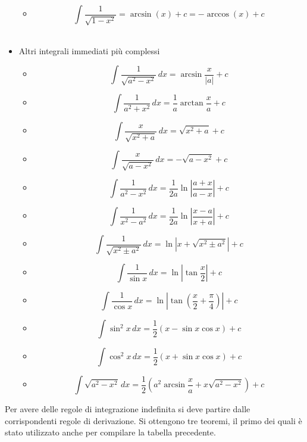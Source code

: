 \documentclass{article}
\theoremstyle{plain}
\theoremstyle{definition}
\theoremstyle{remark}
\begin{document}
\begin{multicols}{2}
\begin{itemize}
\begin{itemize}
            \item[] \[\int \dfrac{1}{\sqrt{1-x^2}}=\arcsin(x)+c=-\arccos(x)+c\]\\
        \end{itemize}
        \item Altri integrali immediati più complessi
        \begin{itemize}
            \item[] \[\int \dfrac{1}{\sqrt{a^2-x^2}} \,dx = \arcsin\dfrac{x}{|a|} +c\]
            \item[] \[\int \dfrac{1}{a^2+x^2} \,dx = \dfrac{1}{a}\arctan\dfrac{x}{a} +c\]
            \item[] \[\int \dfrac{x}{\sqrt{x^2+a}} \,dx = \sqrt{x^2+a} +c\]
            \item[] \[\int \dfrac{x}{\sqrt{a-x^2}} \,dx = -\sqrt{a-x^2} +c\]
            \item[] \[\int \dfrac{1}{a^2-x^2} \,dx = \dfrac{1}{2a}\ln\left|\dfrac{a+x}{a-x}\right| +c\]
	      \item[] \[\int \dfrac{1}{x^2-a^2} \,dx = \dfrac{1}{2a}\ln\left|\dfrac{x-a}{x+a}\right| +c\]
		    \item[] \[\int \dfrac{1}{\sqrt{x^2\pm a^2}} \,dx = \ln|x+\sqrt{x^2\pm a^2}| +c\]
		  \item[] \[\int \dfrac{1}{\sin x} \,dx = \ln\left|\tan\dfrac{x}{2}\right| +c\]
		  \item[] \[\int \dfrac{1}{\cos x} \,dx = \ln\left|\tan\left(\dfrac{x}{2}+\dfrac{\pi}{4}\right)\right| +c\]
		  \item[] \[\int \sin^2x \,dx = \dfrac{1}{2}(x-\sin x\cos x) +c\]
		  \item[] \[\int \cos^2x \,dx = \dfrac{1}{2}(x+\sin x\cos x) +c\]
		  \item[] \[\int \sqrt{a^2-x^2} \,dx = \dfrac{1}{2}(a^2\arcsin\dfrac{x}{a}+x\sqrt{a^2-x^2}) +c\]
        \end{itemize}
	\end{itemize}
\end{multicols}

\vspace{10pt}

Per avere delle regole di integrazione indefinita si deve partire dalle corrispondenti regole di derivazione. Si ottengono tre teoremi, il primo dei quali è stato utilizzato anche per compilare la tabella precedente.

\vspace{10pt}
\end{document}
